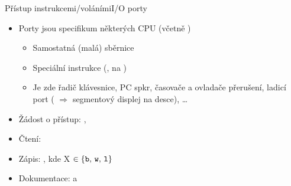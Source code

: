 
\begin{frame}{Přístup instrukcemi/voláními}{I/O porty}

  \begin{itemize}
    \item Porty jsou specifikum některých CPU (včetně \xes)
    \begin{itemize}
      \item Samostatná (malá) sběrnice
      \item Speciální instrukce (,  na \xes)
      \item Je zde řadič klávesnice, PC spkr, časovače a ovladače přerušení,
	ladicí port ( $\Rightarrow$ segmentový displej na desce),
	\dots
    \end{itemize}

    \pause

    \item Žádost o přístup: , 
    \item Čtení: 
    \item Zápis: , kde X $\in\left\{ \text{\code{b}},\,
      \text{\code{w}},\, \text{\code{l}} \right\}$ 
    \item Dokumentace:  a  
  \end{itemize}

\end{frame}

